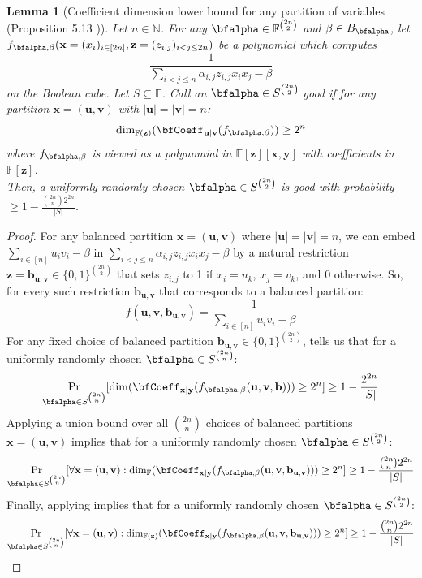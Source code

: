 \documentclass[11pt]{article}
\newtheorem{lemma}[theorem]{Lemma}
\newcommand{\Boo}{\{0,1 \}}
\newcommand{\F}{\mathbb{F}}
\renewcommand{\comment}[2]{\marginpar{\tiny{\textbf{#1: }\textit{#2}}}}
\newcommand{\vr}[1]{\comment{VR}{#1}}
\newcommand{\ssr}[1]{\comment{SS}{#1}}
\begin{document}
\begin{lemma}[Coefficient dimension lower bound for any partition of variables (Proposition 5.13 \cite{FSTW21})]\label{lem: coeff dim any partition}
    Let $n\in \mathbb{N}$. For any $\bfalpha \in \F^{\binom{2n}{2}}$ and $\beta \in B_{\bfalpha}$, let $f_{\bfalpha,\beta}(\mathbf{x}=(x_i)_{i\in[2n]},\mathbf{z}=(z_{i,j})_{i<j\leq 2n})$ be a polynomial which computes $$\frac{1}{\sum_{i<j\leq n}\alpha_{i,j}z_{i,j}x_ix_j - \beta}$$ on the Boolean cube. Let $S\subseteq \F$. Call an $\bfalpha \in S^{\binom{2n}{2}}$ \emph{good} if for any partition $\mathbf{x} = (\mathbf{u},\mathbf{v})$ with $|\mathbf{u}|=|\mathbf{v}| = n$: $$ \dim_{\F(\mathbf{z})}(\bfCoeff_{\mathbf{u}|\mathbf{v}}(f_{\bfalpha,\beta})) \geq 2^n$$
    where $f_{\bfalpha,\beta}$ is viewed as a polynomial in $\F[\mathbf{z}][\mathbf{x},\mathbf{y}]$ with coefficients in $\F[\mathbf{z}]$. \\
    Then, a uniformly randomly chosen $\bfalpha \in S^{\binom{2n}{2}}$ is good with probability $\geq 1 - \frac{\binom{2n}{n}2^{2n}}{|S|}$.
\end{lemma}
\begin{proof}
    For any balanced partition $\mathbf{x} = (\mathbf{u},\mathbf{v})$ where $|\mathbf{u}| = |\mathbf{v}| = n$, we can embed $\sum_{i\in [n]}u_iv_i - \beta$ in $\sum_{i<j\leq n}\alpha_{i,j}z_{i,j}x_ix_j - \beta$ by a natural restriction $\mathbf{z} = \mathbf{b}_{\mathbf{u},\mathbf{v}} \in \Boo^{\binom{2n}{2}}$ that sets $z_{i,j}$ to 1 if $x_i = u_k$, $x_j = v_k$, and 0 otherwise. So, for every such restriction $\mathbf{b}_{\mathbf{u},\mathbf{v}}$ that corresponds to a balanced partition: $$f(\mathbf{u},\mathbf{v},\mathbf{b}_{\mathbf{u},\mathbf{v}}) = \frac{1}{\sum_{i\in[n]}u_iv_i - \beta}$$
    For any fixed choice of balanced partition $\mathbf{b_{\mathbf{u},\mathbf{v}}}\in\Boo^{\binom{2n}{2}}$,  tells us that for a uniformly randomly chosen $\bfalpha \in S^{\binom{2n}{n}}$: $$ \Pr_{\bfalpha \in S^{\binom{2n}{n}}}[\dim (\bfCoeff_{\mathbf{x}|\mathbf{y}}(f_{\bfalpha,\beta}(\mathbf{u},\mathbf{v},\mathbf{b}))) \geq 2^n] \geq 1-\frac{2^{2n}}{|S|} $$
    Applying a union bound over all $\binom{2n}{n}$ choices of balanced partitions $\mathbf{x} = (\mathbf{u},\mathbf{v})$ implies that for a uniformly randomly chosen $\bfalpha \in S^{\binom{2n}{2}}$: $$ \Pr_{\bfalpha \in S^{\binom{2n}{n}}}[\forall \mathbf{x} = (\mathbf{u},\mathbf{v}): \dim_{\F}(\bfCoeff_{\mathbf{x}|\mathbf{y}}(f_{\bfalpha,\beta}(\mathbf{u},\mathbf{v},\mathbf{b}_{\mathbf{u},\mathbf{v}}))) \geq 2^n] \geq 1-\frac{\binom{2n}{n}2^{2n}}{|S|} $$
    Finally, applying  implies that for a uniformly randomly chosen $\bfalpha \in S^{\binom{2n}{2}}$:
    $$ \Pr_{\bfalpha \in S^{\binom{2n}{n}}}[\forall \mathbf{x} = (\mathbf{u},\mathbf{v}): \dim_{\F(\mathbf{z})}(\bfCoeff_{\mathbf{x}|\mathbf{y}}(f_{\bfalpha,\beta}(\mathbf{u},\mathbf{v},\mathbf{b}_{\mathbf{u},\mathbf{v}}))) \geq 2^n] \geq 1-\frac{\binom{2n}{n}2^{2n}}{|S|} $$
\end{proof}
\end{document}
